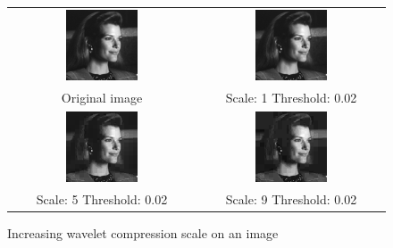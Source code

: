 \documentclass[a4paper]{article}
\begin{document}
\begin{enumerate}
\begin{figure}[H]
\centering
\begin{tabular}{cc}
 \includegraphics[width=0.4\textwidth]{../lab3ex3/tracy.png} & \includegraphics[width=0.4\textwidth]{../lab3ex3/l1t002.png} \\
 Original image & Scale: 1 Threshold: 0.02 \\
 \includegraphics[width=0.4\textwidth]{../lab3ex3/l5t002.png} & \includegraphics[width=0.4\textwidth]{../lab3ex3/l9t002.png}  \\
 Scale: 5 Threshold: 0.02 & Scale: 9 Threshold: 0.02 
\end{tabular}
\caption{Increasing wavelet compression scale on an image}
\label{fig:scaleinc}
\end{figure}


\end{enumerate}
\end{document}
